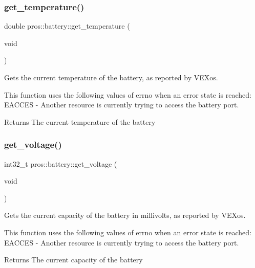 \subsubsection{\texorpdfstring{get\_temperature()}{get\_temperature()}}
{\footnotesize\ttfamily double pros\+::battery\+::get\+\_\+temperature (\begin{DoxyParamCaption}\item[{void}]{ }\end{DoxyParamCaption})}



Gets the current temperature of the battery, as reported by V\+E\+Xos. 

This function uses the following values of errno when an error state is reached\+: E\+A\+C\+C\+ES -\/ Another resource is currently trying to access the battery port.

\begin{DoxyReturn}{Returns}
The current temperature of the battery 
\end{DoxyReturn}
\mbox{\label{namespacepros_1_1battery_a2c325b346f66c15ca7e5a844a66b20d9}} 
\subsubsection{\texorpdfstring{get\_voltage()}{get\_voltage()}}
{\footnotesize\ttfamily int32\+\_\+t pros\+::battery\+::get\+\_\+voltage (\begin{DoxyParamCaption}\item[{void}]{ }\end{DoxyParamCaption})}



Gets the current capacity of the battery in millivolts, as reported by V\+E\+Xos. 

This function uses the following values of errno when an error state is reached\+: E\+A\+C\+C\+ES -\/ Another resource is currently trying to access the battery port.

\begin{DoxyReturn}{Returns}
The current capacity of the battery 
\end{DoxyReturn}
